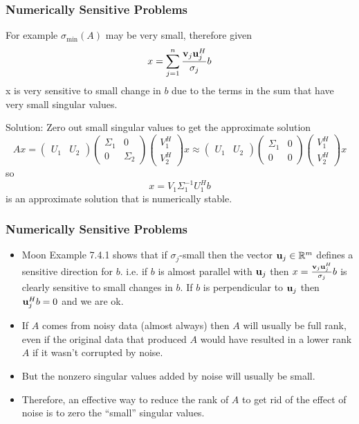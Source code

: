 \documentclass{beamer}
\begin{document}
\begin{frame}\frametitle{Numerically Sensitive Problems}
	For example $\sigma_{\min}(A)$ may be very small, therefore given 
	\[ 
		x = \sum_{j=1}^n \frac{\mathbf{v}_j\mathbf{u}_j^H}{\sigma_j}b 
	\]
	x is very sensitive to small change in $b$ due to the terms in the sum that have very small singular values.	
	
	\vfill
	
	{\color{blue}Solution:}  
	Zero out small singular values to get the approximate solution
	\[ 
		Ax = \begin{pmatrix}
	  			U_1 & U_2  
			 \end{pmatrix}
			 \begin{pmatrix}
	    		\Sigma_1 & 0\\
	    		0 & \Sigma_2
	  		 \end{pmatrix}
	  		 \begin{pmatrix}
	    		V_1^H\\
	    		V_2^H
	  		 \end{pmatrix} x 
	  	\approx \begin{pmatrix}
	    			U_1 & U_2
	  			\end{pmatrix}
	  			\begin{pmatrix}
	    			\Sigma_1 & 0\\
	    			0 & 0
	  			\end{pmatrix}
	  			\begin{pmatrix}
	    			V_1^H\\
	    			V_2^H
	  			\end{pmatrix} x
	\]
	so
	\[ 
		x = V_1\Sigma_1^{-1}U_1^Hb 
	\]
	is an approximate solution that is numerically stable.
\end{frame}

\begin{frame}\frametitle{Numerically Sensitive Problems}
	\begin{itemize}
		\item Moon Example 7.4.1 shows that if $\sigma_j$-small then the vector $\mathbf{u}_j \in \mathbb{R}^m$ defines a sensitive direction for $b$.  i.e. if $b$ is almost parallel with $\mathbf{u}_j$ then $x = \frac{\mathbf{v}_j\mathbf{u}_j^H}{\sigma_j}b$ is clearly sensitive to small changes in $b$.  If $b$ is perpendicular to $\mathbf{u}_j$ then $\mathbf{u}_j^Hb=0$ and we are ok.
		\item If $A$ comes from noisy data (almost always) then $A$ will usually be full rank, even if the original data that produced $A$ would have resulted in a lower rank $A$ if it wasn't corrupted by noise.
		\item But the nonzero singular values added by noise will usually be small.
		\item Therefore, an effective way to reduce the rank of $A$ to get rid of the effect of noise is to zero the ``small'' singular values.
	\end{itemize}
\end{frame}
\end{document}
